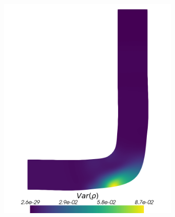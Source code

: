 \begin{figure}[H]
\begin{subfigure}{0.31\linewidth}
		\includegraphics[width=\linewidth]{figs/pipe/pipe_sc_ref_n50_Var(rho).png}
		\caption{}
		\label{fig:referenceSolutionsPipe2}
	\end{subfigure}
	\hfill
	\begin{subfigure}{0.31\linewidth}
		\centering

\end{subfigure}
\end{figure}
